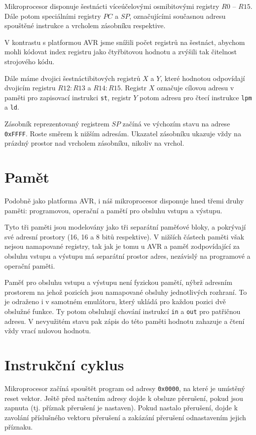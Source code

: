 Mikroprocesor disponuje šestnácti víceúčelovými osmibitovými registry \( R0 \) -- \( R15 \). Dále potom speciálními registry \( PC \) a \( SP \), označujícími současnou adresu spouštěné instrukce a vrcholem zásobníku respektive.

V kontrastu s platformou AVR jsme snížili počet registrů na šestnáct, abychom mohli kódovat index registru jako čtyřbitovou hodnotu a zvýšili tak čitelnost strojového kódu.

Dále máme dvojici šestnáctibitových registrů $X$ a $Y$, které hodnotou odpovídají dvojicím registru $R12:R13$ a $R14:R15$. Registr $X$ označuje cílovou adresu v paměti pro zapisovací instrukci \texttt{st}, registr $Y$ potom adresu pro čtecí instrukce \texttt{lpm} a \texttt{ld}.

Zásobník reprezentovaný registrem $SP$ začíná ve výchozím stavu na adrese \texttt{0xFFFF}. Roste směrem k nižším adresám. Ukazatel zásobníku ukazuje vždy na prázdný prostor nad vrcholem zásobníku, nikoliv na vrchol.

\section{Pamět}

Podobně jako platforma AVR\cite{attiny12-datasheet}, i náš mikroprocesor disponuje hned třemi druhy paměti: programovou, operační a pamětí pro obsluhu vstupu a výstupu.

Tyto tři paměti jsou modelovány jako tři separátní paměťové bloky, a pokrývají své adresní prostory (16, 16 a 8 bitů respektive). V nižších částech paměti však nejsou namapované registry, tak jak je tomu u AVR\cite{attiny12-datasheet} a paměť zodpovídající za obsluhu vstupu a výstupu má separátní prostor adres, nezávislý na programové a operační paměti.

Paměť pro obsluhu vstupu a výstupu není fyzickou pamětí, nýbrž adresním prostorem na jehož pozicích jsou namapované obsluhy jednotlivých rozhraní. To je odraženo i v samotném emulátoru, který ukládá pro každou pozici dvě obslužné funkce. Ty potom obsluhují chování instrukcí \texttt{in} a \texttt{out} pro patřičnou adresu. V nevyužitém stavu pak zápis do této paměti hodnotu zahazuje a čtení vždy vrací nulovou hodnotu.

\section{Instrukční cyklus}

Mikroprocesor začíná spouštět program od adresy \texttt{0x0000}, na které je umístěný reset vektor. Ještě před načtením adresy dojde k obsluze přerušení, pokud jsou zapnuta (tj. příznak přerušení je nastaven). Pokud nastalo přerušení, dojde k zavolání příslušného vektoru přerušení a zakázání přerušení odnastavením jejich příznaku. 

